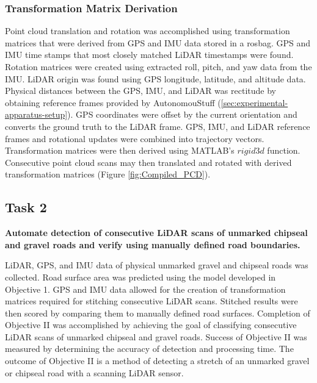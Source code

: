 \documentclass[numbered,pdftex]{ohio-etd}
\begin{document}
{{{			\subsubsection{Transformation Matrix Derivation} \label{sec:grab_tform} {
			
				{Point cloud translation and rotation was accomplished using transformation matrices that were derived from GPS and IMU data stored in a rosbag. GPS and IMU  time stamps that most closely matched LiDAR timestamps were found. Rotation matrices were created using extracted roll, pitch, and yaw data from the IMU. LiDAR origin was found using GPS longitude, latitude, and altitude data. Physical distances between the GPS, IMU, and LiDAR was rectitude by obtaining reference frames provided by AutonomouStuff (\ref{sec:experimental-apparatus-setup}). GPS coordinates were offset by the current orientation and converts the ground truth to the LiDAR frame. GPS, IMU, and LiDAR reference frames and rotational updates were combined into trajectory vectors. Transformation matrices were then derived using MATLAB's $rigid3d$ function. Consecutive point cloud scans may then translated and rotated with derived transformation matrices (Figure \ref{fig:Compiled_PCD}).}
				

				
			} %

		
		} %
		
		\subsection{Task 2}\label{sec:Objective_2_Task_2}{
		
			{\textbf{Automate detection of consecutive LiDAR scans of unmarked chipseal and gravel roads and verify using manually defined road boundaries.} 
				
				{LiDAR, GPS, and IMU data of physical unmarked gravel and chipseal roads was collected. Road surface area was predicted using the model developed in Objective 1. GPS and IMU data allowed for the creation of transformation matrices required for stitching consecutive LiDAR scans. Stitched results were then scored by comparing them to manually defined road surfaces. Completion of Objective II was accomplished by achieving the goal of classifying consecutive LiDAR scans of unmarked chipseal and gravel roads. Success of Objective II was measured by determining the accuracy of detection and processing time. The outcome of Objective II is a method of detecting a stretch of an unmarked gravel or chipseal road with a scanning LiDAR sensor.}
			
}}}}
\end{document}
